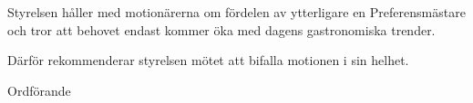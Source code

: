 \documentclass[../_main/handlingar.tex]{subfiles}
\begin{document}
\motionssvar

Styrelsen håller med motionärerna om fördelen av ytterligare en Preferensmästare och tror att behovet endast kommer öka med dagens gastronomiska trender.

Därför rekommenderar styrelsen mötet att bifalla motionen i sin helhet.


\begin{signatures}{1}
    \ist
    \signature{\ordf}{Ordförande}
\end{signatures}
\end{document}
